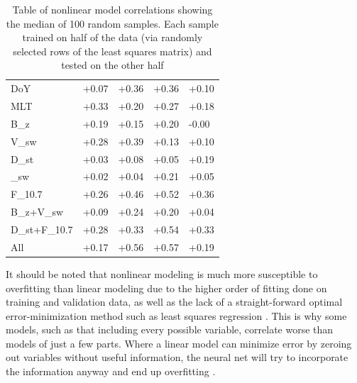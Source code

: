 \begin{table}[h]
	\small
	\begin{tabular}{|L|LLLL|}
		\hline
		&  &  &  & \\ \hline
		DoY & +0.07 & +0.36 & +0.36 & +0.10 \\
		MLT & +0.33 & +0.20 & +0.27 & +0.18 \\
		B_z & +0.19 & +0.15 & +0.20 & -0.00 \\
		V_{sw} & +0.28 & +0.39 & +0.13 & +0.10 \\
		D_{st} & +0.03 & +0.08 & +0.05 & +0.19 \\
		\rho_{sw} & +0.02 & +0.04 & +0.21 & +0.05 \\
		F_{10.7} & +0.26 & +0.46 & +0.52 & +0.36 \\
		B_z+V_{sw} & +0.09 & +0.24 & +0.20 & +0.04 \\
		D_{st}+F_{10.7} & +0.28 & +0.33 & +0.54 & +0.33 \\
		All & +0.17 & +0.56 & +0.57 & +0.19 \\
		\hline
	\end{tabular}
	\caption{Table of nonlinear model correlations showing the median of 100 random samples. Each sample trained on half of the data (via randomly selected rows of the least squares matrix) and tested on the other half} 
	\label{NNperltable}
\end{table}

It should be noted that nonlinear modeling is much more susceptible to overfitting than linear modeling  due to the higher order of fitting done on training and validation data, as well as the lack of a straight-forward optimal error-minimization method such as least squares regression . This is why some models, such as that including every possible variable, correlate worse than models of just a few parts. Where a linear model can minimize error by zeroing out variables without useful information, the neural net will try to incorporate the information anyway and end up overfitting .

